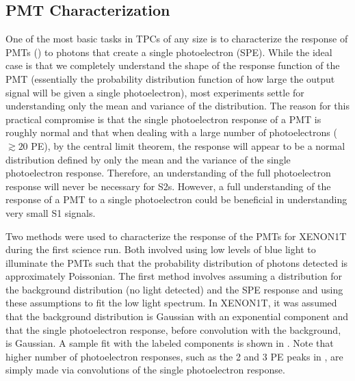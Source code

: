 
\subsection{PMT Characterization}
\label{sec:xe1t_pmt}

One of the most basic tasks in TPCs of any size is to characterize the response of PMTs () to photons that create a single photoelectron (SPE).  While the ideal case is that we completely understand the shape of the response function of the PMT (essentially the probability distribution function of how large the output signal will be given a single photoelectron), most experiments settle for understanding only the mean and variance of the distribution.  The reason for this practical compromise is that the single photoelectron response of a PMT is roughly normal and that when dealing with a large number of photoelectrons ($\gtrsim 20$ PE), by the central limit theorem, the response will appear to be a normal distribution defined by only the mean and the variance of the single photoelectron response.  Therefore, an understanding of the full photoelectron response will never be necessary for S2s.  However, a full understanding of the response of a PMT to a single photoelectron could be beneficial in understanding very small S1 signals.

Two methods were used to characterize the response of the PMTs for XENON1T during the first science run.  Both involved using low levels of blue light to illuminate the PMTs such that the probability distribution of photons detected is approximately Poissonian.  The first method involves assuming a distribution for the background distribution (no light detected) and the SPE response and using these assumptions to fit the low light spectrum.  In XENON1T, it was assumed that the background distribution is Gaussian with an exponential component and that the single photoelectron response, before convolution with the background, is Gaussian.  A sample fit with the labeled components is shown in .  Note that higher number of photoelectron responses, such as the 2 and 3 PE peaks in , are simply made via convolutions of the single photoelectron response.



